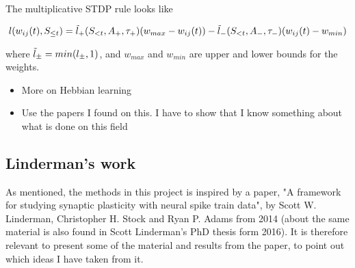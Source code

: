 The multiplicative STDP rule looks like

\begin{equation}
    l(w_{ij}(t), S_{\leq t}) = \Tilde{l}_+(S_{<t}, A_+,\tau_+)(w_{max} - w_{ij}(t))  - \Tilde{l}_-(S_{<t}, A_-,\tau_-)(w_{ij}(t) - w_{min})
\end{equation}

where $\Tilde{l}_{\pm} = min(l_{\pm},1)$, and $w_{max}$ and $w_{min}$ are upper and lower bounds for the weights. 

\begin{itemize}
    \item More on Hebbian learning
    \item Use the papers I found on this. I have to show that I know something about what is done on this field
\end{itemize}


\subsection{Linderman's work}
\label{Linderman}
As mentioned, the methods in this project is inspired by a paper, "A framework for studying synaptic plasticity with neural spike train data", by Scott W. Linderman, Christopher H. Stock and Ryan P. Adams from 2014 (about the same material is also found in Scott Linderman's PhD thesis form 2016). It is therefore relevant to present some of the material and results from the paper, to point out which ideas I have taken from it. 













\cleardoublepage